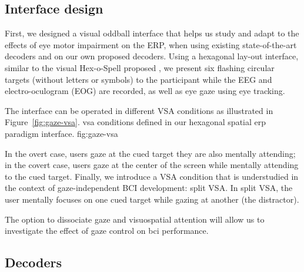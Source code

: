 \subsection{Interface design}


First, we designed a visual oddball interface that helps us study and adapt
to the effects of eye motor impairment on the ERP, when using existing state-of-the-art
decoders and on our own proposed decoders.
Using a hexagonal lay-out interface, similar to the visual Hex-o-Spell proposed
\textcite{Treder2010}, we present six flashing circular targets
(without letters or symbols) to the participant while the EEG and
electro-oculogram (EOG) are recorded, as well as eye gaze using eye tracking.

The interface can be operated in different VSA conditions as illustrated in
Figure~\ref{fig:gaze-vsa}.
\fourpanefig
  {}
  {}
  {}
  {}
  {\Ac{vsa} conditions defined in our hexagonal spatial \ac{erp} paradigm interface.}
  {fig:gaze-vsa}

In the overt case, users gaze at the cued
target they are also mentally attending; in the covert case, users
gaze at the center of the screen while mentally attending to the cued target.
Finally, we introduce a VSA condition that is understudied in the context of
gaze-independent BCI development: split VSA.
In split VSA, the user mentally focuses on one cued target while gazing at
another (the distractor).

The option to dissociate gaze and visuospatial attention will allow us to
investigate the effect of gaze control on \ac{bci} performance.

\subsection{Decoders}

